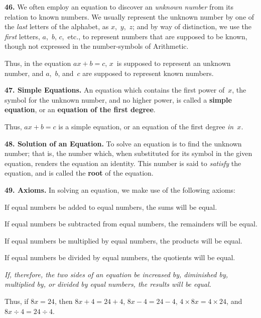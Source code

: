 \documentclass[12pt]{book}[2005/09/16]
\newcommand{\Paragraph}[1]{\medskip\par\textbf{#1}}
\newcommand{\Defn}[1]{\textbf{#1}}
\newenvironment{Remark}[1][]{\par\small\textsc{#1}}{\par}
\newenvironment{Theorem}[1][]{%
  \ifthenelse{\not\equal{#1}{nopar}}{\smallskip\par#1}{}%
  \itshape}{\medskip\upshape\par}
\newcommand{\Ax}[1]{\vspace{4pt plus 16pt}\makebox[3.5em][l]{Ax.\ #1}\ignorespaces}
\begin{document}
\Paragraph{46.}  We often employ an equation to discover an \emph{unknown
number} from its relation to known numbers.  We usually
represent the unknown number by one of the \emph{last} letters
of the alphabet, as $x$,~$y$,~$z$; and by way of distinction, we
use the \emph{first} letters, $a$,~$b$, $c$,~etc., to represent numbers that
are supposed to be known, though not expressed in the
number-symbols of Arithmetic.

\begin{Remark}
Thus, in the equation $ax + b = c$, $x$~is supposed to represent an
unknown number, and $a$,~$b$, and~$c$ are supposed to represent known
numbers.
\end{Remark}

\Paragraph{47.  Simple Equations.}  An equation which contains the
first power of~$x$, the symbol for the unknown number, and
no higher power, is called a \Defn{simple equation}, or an \Defn{equation
of the first degree}.

\begin{Remark}
Thus, $ax + b = c$ is a simple equation, or an equation of the first
degree \emph{in~$x$}.
\end{Remark}

\Paragraph{48.  Solution of an Equation.}  To solve an equation is to
find the unknown number; that is, the number which, when
substituted for its symbol in the given equation, renders the
equation an identity.  This number is said to \emph{satisfy} the
equation, and is called the \Defn{root} of the equation.

\Paragraph{49.  Axioms.}  In solving an equation, we make use of the
following axioms:

\Ax{1.} If equal numbers be added to equal numbers,
the sums will be equal.

\Ax{2.} If equal numbers be subtracted from equal numbers,
the remainders will be equal.

\Ax{3.} If equal numbers be multiplied by equal numbers,
the products will be equal.

\Ax{4.} If equal numbers be divided by equal numbers,
the quotients will be equal.

\begin{Theorem}
If, therefore, the two sides of an equation be increased by,
diminished by, multiplied by, or divided by equal numbers,
the results will be equal.
\end{Theorem}

\begin{Remark}
Thus, if $8x = 24$, then $8x + 4 = 24 + 4$, $8x - 4 = 24 - 4$,
$4 × 8x = 4 × 24$, and $8x ÷ 4 = 24 ÷ 4$.
\end{Remark}
\end{document}

